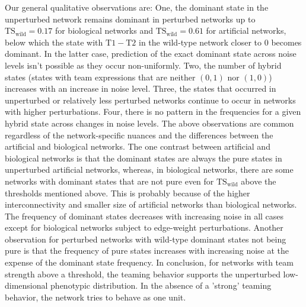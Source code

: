 \documentclass[11pt]{article}
\newcommand{\tsw}{\mathrm{TS_{wild}}}
\begin{document}
Our general qualitative observations are: One, the dominant state in the unperturbed network remains dominant in perturbed networks up to $\tsw = 0.17$ for biological networks and $\tsw = 0.61$ for artificial networks, below which the state with $\mathrm{T1-T2}$ in the wild-type network closer to $0$ becomes dominant. In the latter case, prediction of the exact dominant state across noise levels isn't possible as they occur non-uniformly. Two, the number of hybrid states (states with team expressions that are neither $(0,1)$ nor $(1,0)$) increases with an increase in noise level. Three, the states that occurred in unperturbed or relatively less perturbed networks continue to occur in networks with higher perturbations. Four, there is no pattern in the frequencies for a given hybrid state across changes in noise levels. The above observations are common regardless of the network-specific nuances and the differences between the artificial and biological networks. The one contrast between artificial and biological networks is that the dominant states are always the pure states in unperturbed artificial networks, whereas, in biological networks, there are some networks with dominant states that are not pure even for $\tsw$ above the thresholds mentioned above. This is probably because of the higher interconnectivity and smaller size of artificial networks than biological networks. The frequency of dominant states decreases with increasing noise in all cases except for biological networks subject to edge-weight perturbations. Another observation for perturbed networks with wild-type dominant states not being pure is that the frequency of pure states increases with increasing noise at the expense of the dominant state frequency. In conclusion, for networks with team strength above a threshold, the teaming behavior supports the unperturbed low-dimensional phenotypic distribution. In the absence of a 'strong' teaming behavior, the network tries to behave as one unit.
\end{document}
